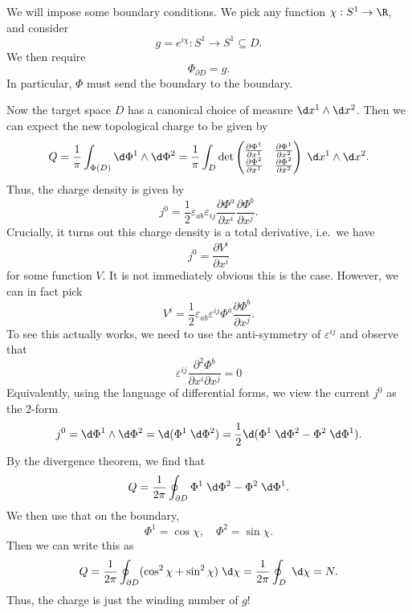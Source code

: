 \documentclass[a4paper]{article}
\begin{document}
We will impose some boundary conditions. We pick any function $\chi: S^1 \to \R$, and consider
\[
  g = e^{i\chi}: S^1 \to S^1 \subseteq D.
\]
We then require
\[
  \Phi_{\partial D} = g.
\]
In particular, $\Phi$ must send the boundary to the boundary.

Now the target space $D$ has a canonical choice of measure $\d x^1 \wedge \d x^2$. Then we can expect the new topological charge to be given by
\[
  Q = \frac{1}{\pi} \int_{\Phi(D)} \d \Phi^1 \wedge \d \Phi^2 = \frac{1}{\pi} \int_D \det
  \begin{pmatrix}
    \frac{\partial \Phi^1}{\partial x^1} & \frac{\partial \Phi^1}{\partial x^2}\\
    \frac{\partial \Phi^2}{\partial x^1} & \frac{\partial \Phi^2}{\partial x^2}
  \end{pmatrix}\;\d x^1 \wedge \d x^2.
\]
Thus, the charge density is given by
\[
  j^0 = \frac{1}{2} \varepsilon_{ab} \varepsilon_{ij} \frac{\partial \Phi^a}{\partial x^i} \frac{\partial \Phi^b}{\partial x^j}.
\]
Crucially, it turns out this charge density is a total derivative, i.e.\ we have
\[
  j^0 = \frac{\partial V^i}{\partial x^i}
\]
for some function $V$. It is not immediately obvious this is the case. However, we can in fact pick
\[
  V^i = \frac{1}{2} \varepsilon_{ab}\varepsilon^{ij} \Phi^a \frac{\partial \Phi^b}{\partial x^j}.
\]
To see this actually works, we need to use the anti-symmetry of $\varepsilon^{ij}$ and observe that
\[
  \varepsilon^{ij} \frac{\partial^2 \Phi^b}{\partial x^i \partial x^j} = 0
\]
Equivalently, using the language of differential forms, we view the current $j^0$ as the $2$-form
\[
  j^0 = \d \Phi^1 \wedge \d \Phi^2 = \d (\Phi^1\;\d \Phi^2) = \frac{1}{2} \d (\Phi^1 \;\d \Phi^2 - \Phi^2 \;\d \Phi^1).
\]
By the divergence theorem, we find that
\[
  Q = \frac{1}{2\pi}\oint_{\partial D} \Phi^1 \;\d \Phi^2 - \Phi^2 \;\d \Phi^1.
\]
We then use that on the boundary,
\[
  \Phi^1 = \cos \chi,\quad \Phi^2 = \sin \chi.
\]
Then we can write this as
\[
  Q = \frac{1}{2\pi} \oint_{\partial D} (\cos^2 \chi + \sin^2 \chi) \;\d \chi = \frac{1}{2\pi} \oint_D \;\d \chi = N.
\]
Thus, the charge is just the winding number of $g$!
\end{document}
